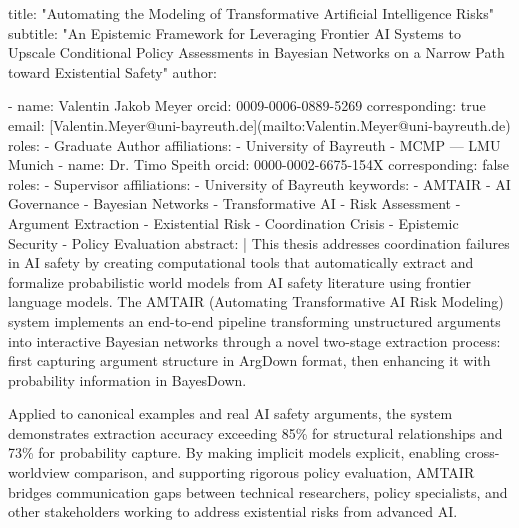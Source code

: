 \documentclass[
  11pt,
  letterpaper,
]{book}
\newenvironment{Shaded}{\begin{snugshade}}{\end{snugshade}}
\newcommand{\AnnotationTok}[1]{\textcolor[rgb]{0.37,0.37,0.37}{#1}}
\newcommand{\CommentTok}[1]{\textcolor[rgb]{0.37,0.37,0.37}{#1}}
\newcommand{\NormalTok}[1]{\textcolor[rgb]{0.00,0.23,0.31}{#1}}
\newcommand{\OtherTok}[1]{\textcolor[rgb]{0.00,0.23,0.31}{#1}}
\newcommand{\SpecialStringTok}[1]{\textcolor[rgb]{0.13,0.47,0.30}{#1}}
\begin{document}
\begin{Shaded}
\begin{Highlighting}[]
\AnnotationTok{title:}\CommentTok{ "Automating the Modeling of Transformative Artificial Intelligence Risks" subtitle: "An Epistemic Framework for Leveraging Frontier AI Systems to Upscale Conditional Policy Assessments in Bayesian Networks on a Narrow Path toward Existential Safety" author:}

\SpecialStringTok{{-} }\NormalTok{name: Valentin Jakob Meyer orcid: 0009{-}0006{-}0889{-}5269 corresponding: true email: }\CommentTok{[}\OtherTok{Valentin.Meyer@uni{-}bayreuth.de}\CommentTok{](mailto:Valentin.Meyer@uni{-}bayreuth.de)}\NormalTok{ roles:}
\SpecialStringTok{    {-} }\NormalTok{Graduate Author affiliations:}
\SpecialStringTok{    {-} }\NormalTok{University of Bayreuth}
\SpecialStringTok{    {-} }\NormalTok{MCMP — LMU Munich}
\SpecialStringTok{{-} }\NormalTok{name: Dr. Timo Speith orcid: 0000{-}0002{-}6675{-}154X corresponding: false roles:}
\SpecialStringTok{    {-} }\NormalTok{Supervisor affiliations:}
\SpecialStringTok{    {-} }\NormalTok{University of Bayreuth keywords:}
\SpecialStringTok{{-} }\NormalTok{AMTAIR}
\SpecialStringTok{{-} }\NormalTok{AI Governance}
\SpecialStringTok{{-} }\NormalTok{Bayesian Networks}
\SpecialStringTok{{-} }\NormalTok{Transformative AI}
\SpecialStringTok{{-} }\NormalTok{Risk Assessment}
\SpecialStringTok{{-} }\NormalTok{Argument Extraction}
\SpecialStringTok{{-} }\NormalTok{Existential Risk}
\SpecialStringTok{{-} }\NormalTok{Coordination Crisis}
\SpecialStringTok{{-} }\NormalTok{Epistemic Security}
\SpecialStringTok{{-} }\NormalTok{Policy Evaluation abstract: | This thesis addresses coordination failures in AI safety by creating computational tools that automatically extract and formalize probabilistic world models from AI safety literature using frontier language models. The AMTAIR (Automating Transformative AI Risk Modeling) system implements an end{-}to{-}end pipeline transforming unstructured arguments into interactive Bayesian networks through a novel two{-}stage extraction process: first capturing argument structure in ArgDown format, then enhancing it with probability information in BayesDown.}

\NormalTok{Applied to canonical examples and real AI safety arguments, the system demonstrates extraction accuracy exceeding 85\% for structural relationships and 73\% for probability capture. By making implicit models explicit, enabling cross{-}worldview comparison, and supporting rigorous policy evaluation, AMTAIR bridges communication gaps between technical researchers, policy specialists, and other stakeholders working to address existential risks from advanced AI.}


\end{Highlighting}
\end{Shaded}
\end{document}
